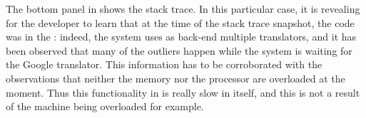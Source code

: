 The bottom panel in  shows the stack trace. 
In this particular case, it is revealing for the developer to learn that at the time of the stack trace snapshot, the code was in the : indeed, the system uses as back-end multiple translators, and it has been observed that many of the outliers happen while the system is waiting for the Google translator.
%
This information has to be corroborated with the observations that neither the memory nor the processor are overloaded at the moment. Thus this functionality in  is really slow in itself, and this is not a result of the machine being overloaded for example. 










